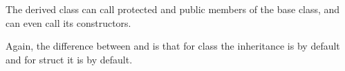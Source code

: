 The derived class can call protected and public members of the base class, and can even call its constructors.

\begin{rem}
  Again, the difference between  and  is that for class the inheritance is  by default and for struct
  it is  by default.
\end{rem}
